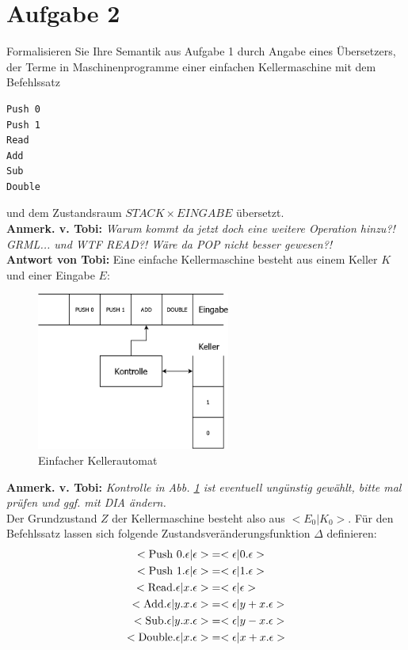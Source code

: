 \documentclass[ngerman,a4paper]{report}
\begin{document}
\section*{Aufgabe 2}
Formalisieren Sie Ihre Semantik aus Aufgabe 1 durch Angabe eines Übersetzers, der Terme in Maschinenprogramme einer einfachen Kellermaschine mit dem Befehlssatz
\begin{lstlisting}
Push 0
Push 1
Read
Add
Sub
Double
\end{lstlisting}
und dem Zustandsraum $STACK \times EINGABE$ übersetzt.\\
\textbf{Anmerk. v. Tobi:} \emph{Warum kommt da jetzt doch eine weitere Operation hinzu?! GRML... und WTF READ?! Wäre da POP nicht besser gewesen?!}\\
\textbf{Antwort von Tobi:} Eine einfache Kellermaschine besteht aus einem Keller $K$ und einer Eingabe $E$:\\
\begin{figure}[h]
	\centering
	\includegraphics[width=240px]{../../gfx/einfacheKellermaschine.png}
	\caption{Einfacher Kellerautomat}\label{gfx:ekeller}
\end{figure}
\textbf{Anmerk. v. Tobi:} \emph{Kontrolle in Abb. \ref{gfx:ekeller} ist eventuell ungünstig gewählt, bitte mal prüfen und ggf. mit DIA ändern.}\\
Der Grundzustand $Z$ der Kellermaschine besteht also aus $<E_0|K_0>$. Für den Befehlssatz lassen sich folgende Zustandsveränderungsfunktion $\Delta$ definieren:
\begin{align*}
<\text{\lstinline!Push 0!}.\epsilon|\epsilon> &= <\epsilon|0.\epsilon>\\
<\text{\lstinline!Push 1!}.\epsilon|\epsilon> &= <\epsilon|1.\epsilon>\\
<\text{\lstinline!Read!}.\epsilon|x.\epsilon> &= <\epsilon|\epsilon>\\
<\text{\lstinline!Add!}.\epsilon|y.x.\epsilon> &= <\epsilon|y+x.\epsilon>\\
<\text{\lstinline!Sub!}.\epsilon|y.x.\epsilon> &= <\epsilon|y-x.\epsilon>\\
<\text{\lstinline!Double!}.\epsilon|x.\epsilon> &= <\epsilon|x+x.\epsilon>\\
\end{align*}
\end{document}

